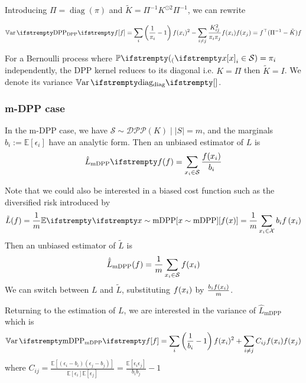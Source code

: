 Introducing $\Pi = \operatorname{diag}(\pi)$ and $\tilde K = \Pi^{-1}K^{\odot 2} \Pi^{-1}$, we can rewrite  

\begin{equation}
	\Var{\textrm{DPP}}{\query}=\sum_{i}\left(\frac{1}{\pi_{i}}-1\right) \query(x_{i})^{2}-\sum_{i \neq j} \frac{K_{ij}^{2}}{\pi_{i} \pi_{j}} \query(x_{i}) \query(x_{j}) =  \query\T (\Pi^{-1}  - \tilde{K}) \query 
\end{equation}

For a Bernoulli process where $\PP(x_i \in \mathcal S) = \pi_i$ independently, the DPP kernel reduces to its diagonal i.e. $K = \Pi$ then $\tilde K = I$. We denote its variance $\Var{\textrm{diag}}{}$.


\subsubsection{m-DPP case}

In the m-DPP case, we have $\mathcal S \sim \mathcal{DPP}(K) \mid |S|=m$, and the marginals $b_{i} := \mathbb{E}\left[\epsilon_{i}\right]$ have an analytic form. Then an unbiased estimator of $L$ is
\begin{equation*}
	\estloss{\textrm{mDPP}}{\query} = \sum_{x_i\in \mathcal S} \frac{\query(x_i)}{b_i}
\end{equation*}

Note that we could also be interested in a biased cost function such as the diversified risk introduced by \cite{zhang2017dppminibatch}
$$
\tilde L({\query}) =\frac{1}{m}\EE{}{x \sim \textrm{mDPP}}[\query(x)]=\frac{1}{m}\sum_{x_i \in \mathcal X} b_{i} \query\left(x_{i}\right)
$$
Then an unbiased estimator of $\tilde L$ is
\begin{equation*}
	\hat{\tilde L}_{\textrm{mDPP}}({f}) = \frac{1}{m}\sum_{x_i\in \mathcal S} f(x_i)
\end{equation*}
We can switch between $L$ and $\tilde L$, substituting $f(x_i)$ by $\frac{b_i f(x_i)}{m}$.

Returning to the estimation of $L$, we are interested in the variance of $\hat L_{\textrm{mDPP}}$ which is
\begin{equation}
	\Var{\textrm{mDPP}}{\query}=\sum_{i}\left(\frac{1}{b_i}-1\right) \query(x_i)^2
	+ \sum_{i \neq j} C_{ij}\query(x_i) \query(x_j)
\end{equation}
where $C_{ij}=\frac{\mathbb{E}\left[\left(\epsilon_{i}-b_{i}\right)\left(\epsilon_{j}-b_{j}\right)\right]}{\mathbb{E}\left[\epsilon_{i}\right] \mathbb{E}\left[\epsilon_{j}\right]}=\frac{\mathbb{E}\left[\epsilon_{i} \epsilon_{j}\right]}{b_{i} b_{j}}-1
$

